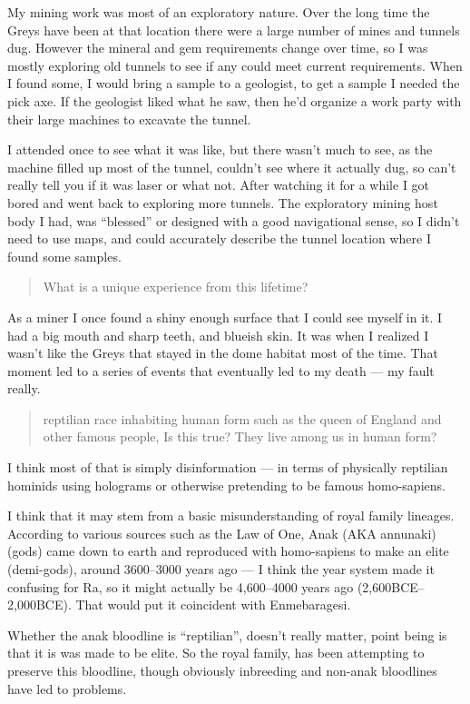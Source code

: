 My mining work was most of an exploratory nature. Over the long time the Greys
have been at that location there were a large number of mines and tunnels dug.
However the mineral and gem requirements change over time, so I was mostly
exploring old tunnels to see if any could meet current requirements. When I
found some, I would bring a sample to a geologist, to get a sample I needed the
pick axe. If the geologist liked what he saw, then he'd organize a work party
with their large machines to excavate the tunnel.

I attended once to see what it was like, but there wasn't much to see, as the
machine filled up most of the tunnel, couldn't see where it actually dug, so
can't really tell you if it was laser or what not. After watching it for a while
I got bored and went back to exploring more tunnels. The exploratory mining host
body I had, was ``blessed'' or designed with a good navigational sense, so I
didn't need to use maps, and could accurately describe the tunnel location where
I found some samples.


\blockquote{What is a unique experience from this lifetime?}

 As a miner I once found a shiny enough surface that I could see myself in it. I had a big mouth and sharp teeth, and blueish skin. It was when I realized I wasn't like the Greys that stayed in the dome habitat most of the time. That moment led to a series of events that eventually led to my death --- my fault really. 

\blockquote{reptilian race inhabiting human form such as the queen of England and other famous people, Is this true? They live among us in human form? }

I think most of that is simply disinformation --- in terms of physically
reptilian hominids using holograms or otherwise pretending to be famous
homo-sapiens.

I think that it may stem from a basic misunderstanding of royal family lineages.
According to various sources such as the Law of One, Anak (AKA annunaki) (gods)
came down to earth and reproduced with homo-sapiens to make an elite
(demi-gods), around 3600--3000 years ago --- I think the year system made it
confusing for Ra, so it might actually be 4,600--4000 years ago 
(2,600BCE--2,000BCE). That would put it coincident with Enmebaragesi.

Whether the anak bloodline is ``reptilian'', doesn't really matter, point being is
that it is was made to be elite. So the royal family, has been attempting to
preserve this bloodline, though obviously inbreeding and non-anak bloodlines
have led to problems.

